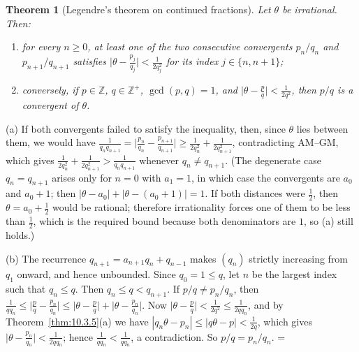 \documentclass[11pt]{article}
\makeatletter
\let\nt@closedisplay\]
\def\nt@guardedclose{\@ifnextchar\par{\nt@closeafterpar}{\@ifnextchar\end{\postdisplaypenalty\@M\nt@closedisplay}{\nt@closedisplay}}}
\def\nt@closeafterpar\par{\@ifnextchar\par{\nt@closeafterpar}{\@ifnextchar\end{\postdisplaypenalty\@M\nt@closedisplay\par}{\nt@closedisplay\par}}}
\renewenvironment{proof}[1][\proofname]{\par
  \pushQED{\qed}\normalfont\topsep\medskipamount\edef\nt@afterproof{\@endparpenalty=\the\@endparpenalty\relax}\@beginparpenalty\@M\@endparpenalty\@M\let\]\nt@guardedclose\trivlist\item[]\textit{#1\@addpunct{.}} \ignorespaces}{\ifvmode\addpenalty\@M\fi\popQED\nt@afterproof\endtrivlist\@endpefalse}
\theoremstyle{ntstyle}
\newtheorem{theorem}{Theorem}[subsection]
\makeatother
\begin{document}
\begin{theorem}[Legendre's theorem on continued fractions]\label{thm:10.3.6}\label{thm:legendre-theorem-on-continued-fractions}
  Let $\theta$ be
  irrational. Then:
  \begin{enumerate}[label={\alph*)}]
    \item for every $n\ge0$, at least one of the two consecutive
          convergents $p_n/q_n$ and $p_{n+1}/q_{n+1}$ satisfies
          $\big|\theta-\tfrac{p_j}{q_j}\big|<\tfrac{1}{2q_j^{2}}$
          for its index $j\in\{n,n+1\}$;
    \item conversely, if $p\in\mathbb{Z}$, $q\in\mathbb{Z}^+$,
          $\gcd(p, q)=1$, and
          $\big|\theta-\tfrac{p}{q}\big|<\tfrac{1}{2q^{2}}$, then $p/q$
          is a convergent of $\theta$.
  \end{enumerate}

\end{theorem}

\begin{proof} (a) If both convergents failed to satisfy the inequality, then, since
  $\theta$ lies between them, we would have
  $\tfrac{1}{q_nq_{n+1}}=\big|\tfrac{p_n}{q_n}-\tfrac{p_{n+1}}{q_{n+1}}\big|\ge\tfrac{1}{2q_n^2}+\tfrac{1}{2q_{n+1}^2}$,
  contradicting AM--GM, which gives
  $\tfrac{1}{2q_n^2}+\tfrac{1}{2q_{n+1}^2}>\tfrac{1}{q_nq_{n+1}}$ whenever
  $q_n\neq q_{n+1}$. (The degenerate case $q_n=q_{n+1}$ arises only for
  $n=0$ with $a_1=1$, in which case the convergents are $a_0$ and $a_0+1$; then
  $|\theta-a_0|+|\theta-(a_0+1)|=1$. If both distances were
  $\tfrac{1}{2}$, then $\theta=a_0+\tfrac{1}{2}$ would be rational;
  therefore irrationality forces one of them to be
  less than $\tfrac{1}{2}$, which is the required bound because both denominators
  are $1$, so (a) still holds.)

  (b) The recurrence $q_{n+1}=a_{n+1}q_n+q_{n-1}$ makes $(q_n)$ strictly increasing from $q_1$ onward, and hence unbounded.
  Since $q_0=1\le q$, let $n$ be the largest index such that $q_n\le q$.
  Then $q_n\le q<q_{n+1}$. If $p/q\neq p_n/q_n$, then
  $\tfrac{1}{qq_n}\le\big|\tfrac{p}{q}-\tfrac{p_n}{q_n}\big|\le\big|\theta-\tfrac{p}{q}\big|+\big|\theta-\tfrac{p_n}{q_n}\big|$.
  Now $\big|\theta-\tfrac{p}{q}\big|<\tfrac{1}{2q^2}\le\tfrac{1}{2qq_n}$, and by Theorem~\ref{thm:10.3.5}(a) we
  have
  $|q_n\theta-p_n|\le|q\theta-p|<\tfrac{1}{2q}$, which gives
  $\big|\theta-\tfrac{p_n}{q_n}\big|<\tfrac{1}{2qq_n}$; hence
  $\tfrac{1}{qq_n}<\tfrac{1}{qq_n}$, a contradiction. So $p/q=p_n/q_n$.
\end{proof}
\end{document}
